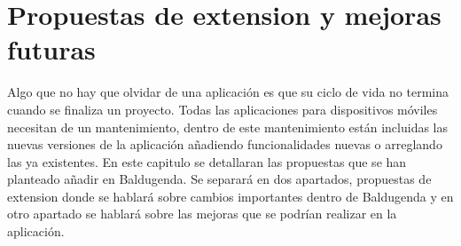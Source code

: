 \chapter{Propuestas de extension y mejoras futuras}

Algo que no hay que olvidar de una aplicación es que su ciclo de vida no termina cuando se finaliza un proyecto. Todas las aplicaciones para dispositivos móviles necesitan de un mantenimiento, dentro de este mantenimiento están incluidas las nuevas versiones de la aplicación añadiendo funcionalidades nuevas o arreglando las ya existentes.
En este capitulo se detallaran las propuestas que se han planteado añadir en Baldugenda.
Se separará en dos apartados, propuestas de extension donde se hablará sobre cambios importantes dentro de Baldugenda y en otro apartado se hablará sobre las mejoras que se podrían realizar en la aplicación.
\newpage

\newpage
